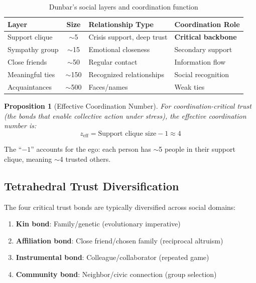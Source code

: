 \documentclass[11pt]{article}
\newtheorem{proposition}{Proposition}
\begin{document}
\begin{table}[h]
\centering
\caption{Dunbar's social layers and coordination function}
\begin{tabular}{lcll}
\toprule
\textbf{Layer} & \textbf{Size} & \textbf{Relationship Type} & \textbf{Coordination Role} \\
\midrule
Support clique & $\sim$5 & Crisis support, deep trust & \textbf{Critical backbone} \\
Sympathy group & $\sim$15 & Emotional closeness & Secondary support \\
Close friends & $\sim$50 & Regular contact & Information flow \\
Meaningful ties & $\sim$150 & Recognized relationships & Social recognition \\
Acquaintances & $\sim$500 & Faces/names & Weak ties \\
\bottomrule
\end{tabular}
\end{table}

\begin{proposition}[Effective Coordination Number]
For coordination-critical trust (the bonds that enable collective action under stress), the effective coordination number is:
\begin{equation}
z_{\text{eff}} = \text{Support clique size} - 1 \approx 4
\end{equation}
\end{proposition}

The ``$-1$'' accounts for the ego: each person has $\sim$5 people in their support clique, meaning $\sim$4 trusted others.

\subsection{Tetrahedral Trust Diversification}

The four critical trust bonds are typically diversified across social domains:

\begin{enumerate}
\item \textbf{Kin bond}: Family/genetic (evolutionary imperative)
\item \textbf{Affiliation bond}: Close friend/chosen family (reciprocal altruism)
\item \textbf{Instrumental bond}: Colleague/collaborator (repeated game)
\item \textbf{Community bond}: Neighbor/civic connection (group selection)
\end{enumerate}
\end{document}
